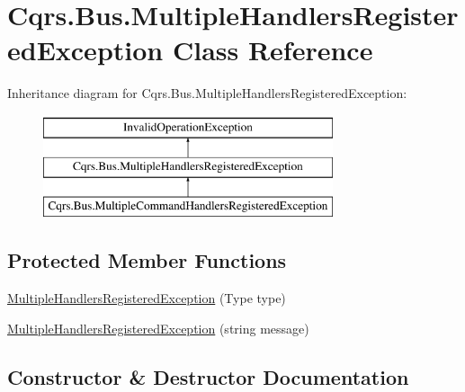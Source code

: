 \hypertarget{classCqrs_1_1Bus_1_1MultipleHandlersRegisteredException}{}\section{Cqrs.\+Bus.\+Multiple\+Handlers\+Registered\+Exception Class Reference}
\label{classCqrs_1_1Bus_1_1MultipleHandlersRegisteredException}
Inheritance diagram for Cqrs.\+Bus.\+Multiple\+Handlers\+Registered\+Exception\+:\begin{figure}[H]
\begin{center}
\leavevmode
\includegraphics[height=3.000000cm]{classCqrs_1_1Bus_1_1MultipleHandlersRegisteredException}
\end{center}
\end{figure}
\subsection*{Protected Member Functions}
\begin{DoxyCompactItemize}
\item 
\hyperlink{classCqrs_1_1Bus_1_1MultipleHandlersRegisteredException_abdd28d6ed537ada1d0cb0133e366c431_abdd28d6ed537ada1d0cb0133e366c431}{Multiple\+Handlers\+Registered\+Exception} (Type type)
\item 
\hyperlink{classCqrs_1_1Bus_1_1MultipleHandlersRegisteredException_ab6bb75aa5785b323f376b25b0b8d4713_ab6bb75aa5785b323f376b25b0b8d4713}{Multiple\+Handlers\+Registered\+Exception} (string message)
\end{DoxyCompactItemize}


\subsection{Constructor \& Destructor Documentation}
\mbox{\label{classCqrs_1_1Bus_1_1MultipleHandlersRegisteredException_abdd28d6ed537ada1d0cb0133e366c431_abdd28d6ed537ada1d0cb0133e366c431}} 
